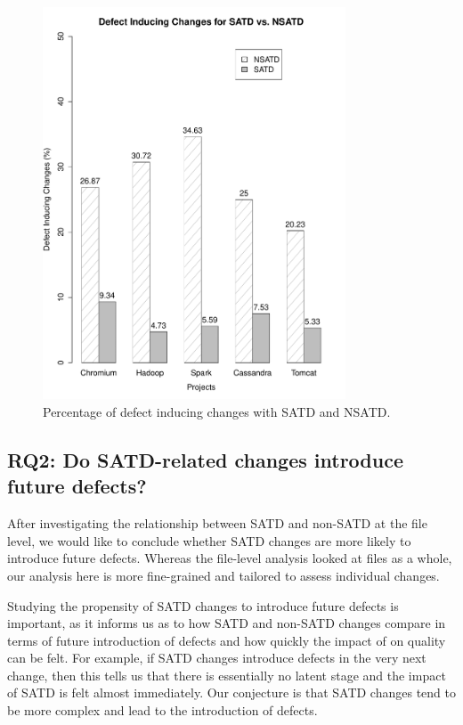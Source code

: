 \begin{figure}[tb!]
	\centering
	\includegraphics[width=90mm]{figures/chapter3/bug_inducing_changes}
	\caption{Percentage of defect inducing changes with SATD and NSATD.}
	\label{figure:bug_inducing_changes}
\end{figure}

\subsection*{RQ2: Do SATD-related changes introduce future defects?}

 After investigating the relationship between SATD and non-SATD at the file level, we would like to conclude whether SATD changes are more likely to introduce future defects. Whereas the file-level analysis looked at files as a whole, our analysis here is more fine-grained and tailored to assess individual changes.

Studying the propensity of SATD changes to introduce future defects is important, as it informs us as to how SATD and non-SATD changes compare in terms of future introduction of defects and how quickly the impact of \SATD on quality can be felt. For example, if SATD changes introduce defects in the very next change, then this tells us that there is essentially no latent stage and the impact of SATD is felt almost immediately. Our conjecture is that SATD changes tend to be more complex and lead to the introduction of defects.


